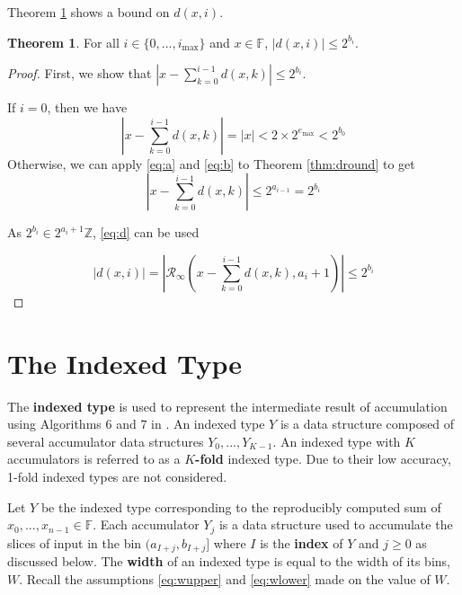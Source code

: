 \documentclass[12pt]{article}
\providecommand{\F}{\ensuremath{\mathbb{F}}}
\providecommand{\Z}{\ensuremath{\mathbb{Z}}}
\providecommand{\max}{\ensuremath{\text{max}}}
\providecommand{\roundtonearestinfty}{\ensuremath{\mathcal{R}_\text{$\infty$}}}
\theoremstyle{definition}
\newtheorem{thm}{Theorem}[section]
\numberwithin{equation}{section}
\numberwithin{figure}{section}
\begin{document}
    Theorem \ref{thm:dbound} shows a bound on $d(x, i)$.

    \begin{samepage}
    \begin{thm}
      For all $i \in \{0, ..., i_{\max}\}$ and $x \in \F$, $|d(x, i)| \leq 2^{b_i}$.
      \label{thm:dbound}
    \end{thm}
    \end{samepage}

    \begin{proof}
      First, we show that $|x - \sum\limits_{k=0}^{i - 1}d(x,k)| \leq 2^{b_i}$.

      If $i = 0$, then we have
      \begin{equation*}
        |x - \sum\limits_{k=0}^{i - 1}d(x,k)| = |x| < 2 \times 2^{e_{\max}} < 2^{b_0}
      \end{equation*}
      Otherwise, we can apply  \eqref{eq:a} and \eqref{eq:b} to Theorem \ref{thm:dround} to get
      \begin{equation*}
        |x - \sum \limits_{k = 0}^{i - 1}d(x, k)| \leq 2^{a_{i - 1}} = 2^{b_i}
      \end{equation*}

      As $2^{b_i} \in 2^{a_i + 1}\Z$,  \eqref{eq:d} can be used

      \begin{equation*}
        |d(x, i)| = |\roundtonearestinfty(x - \sum\limits_{k=0}^{i - 1}d(x,k), a_i + 1)| \leq 2^{b_i}
      \end{equation*}
    \end{proof}

\section{The Indexed Type}
  \label{sec:indexed}
    The \textbf{indexed type} is used to represent the intermediate result of accumulation using Algorithms 6 and $7$ in \cite{repsum}.
    An indexed type $Y$ is a data structure composed of several accumulator data structures $Y_0, ..., Y_{K - 1}$. An indexed type with $K$ accumulators is referred to as a \textbf{$K$-fold} indexed type. Due to their low accuracy, 1-fold indexed types are not considered.

    Let $Y$ be the indexed type corresponding to the reproducibly computed sum of $x_0, ..., x_{n - 1} \in \F$.
    Each accumulator $Y_j$ is a data structure used to accumulate the slices of input in the bin $(a_{I + j}, b_{I + j}]$ where $I$ is the \textbf{index} of $Y$ and $j \geq 0$ as discussed below. The \textbf{width} of an indexed type is equal to the width of its bins, $W$. Recall the assumptions \eqref{eq:wupper} and \eqref{eq:wlower} made on the value of $W$.
\end{document}
